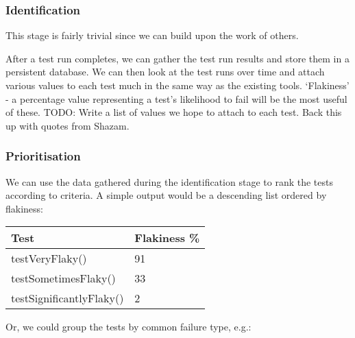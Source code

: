 \subsubsection{Identification}

This stage is fairly trivial since we can build upon the work of others.

After a test run completes, we can gather the test run results and store them in a persistent database. We can then look at the test runs over time and attach various values to each test much in the same way as the existing tools. ‘Flakiness’ - a percentage value representing a test’s likelihood to fail will be the most useful of these.
TODO: Write a list of values we hope to attach to each test. Back this up with quotes from Shazam.

\subsubsection{Prioritisation}

We can use the data gathered during the identification stage to rank the tests according to criteria. A simple output would be a descending list ordered by flakiness:

\begin{center}
    \begin{tabular}{ | l | p{5cm} |}
    \hline
    Test & Flakiness \% \\ \hline
    testVeryFlaky() & 91 \\ \hline
    testSometimesFlaky() & 33 \\ \hline
    testSignificantlyFlaky() & 2 \\ \hline
    \end{tabular}
\end{center}

Or, we could group the tests by common failure type, e.g.:


